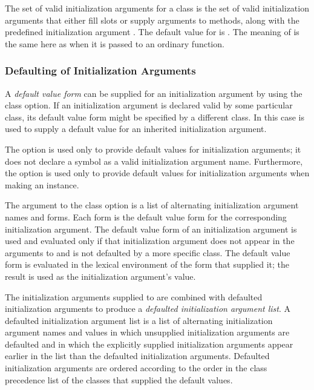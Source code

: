 The set of valid initialization arguments for a class is the set of
valid initialization arguments that either fill slots or supply
arguments to methods, along with the predefined initialization
argument .  The default value for 
 is .  The meaning of 
 is the same here as when it is passed to an ordinary
function.

\subsubsection{Defaulting of Initialization Arguments}
\label{DEFAULTING-INITIALIZATION-ARGUMENTS}

A \emph{default value form} can be supplied for an initialization
argument by using the  class option.  If an
initialization argument is declared valid by some particular class,
its default  value form might be specified by a different class. 
In this case  is used to supply a default value
for an inherited initialization argument.

The  option is used only to provide default
values for initialization arguments; it does not declare a symbol as a
valid initialization argument name. Furthermore, the 
 option is used only to provide default values for
initialization arguments when making an instance.

The argument to the  class option is a list of
alternating initialization argument names and forms.  Each form is the
default  value form for the corresponding initialization
argument.  The default  value form of an initialization
argument is used and evaluated only if that initialization argument
does not appear in the arguments to  and is not
defaulted by a more specific class.  The default  value form is
evaluated in the lexical environment of the  form that
supplied it; the result is used as the initialization
argument's value.

The initialization arguments supplied to  are combined
with defaulted initialization arguments to produce a \emph{defaulted
  initialization argument list}. A defaulted initialization argument list is a
list of alternating initialization argument names and values in which unsupplied
initialization arguments are defaulted and in 
which the explicitly supplied initialization arguments appear earlier in
the list than the defaulted initialization arguments.  Defaulted
initialization arguments are ordered according to the order in the class
precedence list of the classes that supplied the default values.

